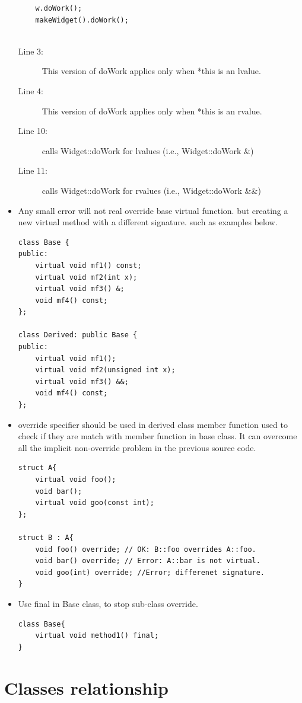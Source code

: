 \documentclass[a4paper,11pt,twoside]{book}
\begin{document}
\begin{itemize}
\begin{lstlisting}
	w.doWork();
	makeWidget().doWork();
	
\end{lstlisting}
\begin{description}
	\item[Line 3:] This version of doWork applies only when *this is an lvalue.
	\item[Line 4:] This version of doWork applies only when *this is an rvalue.
	\item[Line 10:] calls Widget::doWork for lvalues (i.e., Widget::doWork \&)
	\item[Line 11:] calls Widget::doWork for rvalues (i.e., Widget::doWork \&\&)
\end{description}
	
\item Any small error will not real override base virtual function. but creating a new virtual method with a different signature. such as examples below.
\begin{lstlisting}[numbers=none]
class Base {
public:
	virtual void mf1() const;
	virtual void mf2(int x);
	virtual void mf3() &;
	void mf4() const;
};

class Derived: public Base {
public:
	virtual void mf1();
	virtual void mf2(unsigned int x);
	virtual void mf3() &&;
	void mf4() const;
};
\end{lstlisting}
	
	\item override specifier should be used in derived class member function used to check if they are match with member function in base class. It can overcome all the implicit non-override problem in the previous source code.
\begin{lstlisting}[numbers=none]
struct A{
	virtual void foo();
	void bar();
	virtual void goo(const int);
};
	
struct B : A{
	void foo() override; // OK: B::foo overrides A::foo.
	void bar() override; // Error: A::bar is not virtual.
	void goo(int) override; //Error; differenet signature. 
}
\end{lstlisting}
	
\item Use final in Base class, to stop sub-class override.
\begin{lstlisting}[numbers=none]
class Base{
	virtual void method1() final;
}
\end{lstlisting}
	
\end{itemize}

\section{Classes relationship}
\end{document}
